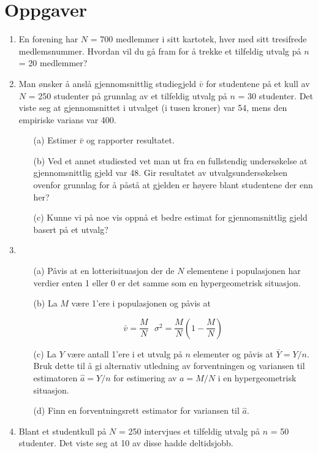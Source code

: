 \section{Oppgaver}
\small
\begin{enumerate}
\item  En forening har $N$ = 700 medlemmer i sitt kartotek, hver med sitt
tresifrede medlemsnummer.  Hvordan vil du gå fram for å trekke et
tilfeldig utvalg på $n$= 20 medlemmer?

\item  Man ønsker å anslå gjennomsnittlig studiegjeld $\bar{v}$
for studentene på et kull av $N$ = 250 studenter på grunnlag av et
tilfeldig utvalg på $n$ = 30 studenter.  Det viste seg at gjennomsnittet
i utvalget (i tusen kroner) var 54, mens den empiriske varians var 400.

\begin{itemize}
\item[(a)]  Estimer $\bar{v}$ og rapporter resultatet.
\item[(b)]  Ved et annet studiested vet man ut fra en fullstendig 
undersøkelse at gjennomsnittlig gjeld var 48.  Gir resultatet av
utvalgsundersøkelsen ovenfor grunnlag for å påstå at gjelden
er høyere blant studentene der enn her?
\item[(c)]  Kunne vi på noe vis oppnå et bedre estimat for 
gjennomsnittlig gjeld basert på et utvalg?
\end{itemize}

\item
\begin{itemize}
\item[(a)] Påvis at en lotterisituasjon der de $N$ elementene i populasjonen
har verdier enten 1 eller 0 er det samme som en hypergeometrisk situasjon.
\item[(b)]  La $M$ være 1'ere i populasjonen og påvis at

\[ \bar{v}=\frac{M}{N}  \mbox{\ \ \ } {\sigma}^2=\frac{M}{N}(1-\frac{M}{N}) \]

\item[(c)]  La $Y$ være antall 1'ere i et utvalg på $n$ elementer og 
påvis at $\bar{Y} = Y/n$.  Bruk dette til å gi alternativ
utledning av forventningen og variansen til estimatoren $\hat{a} = Y/n$
for estimering av $a = M/N$ i en hypergeometrisk situasjon.
\item[(d)]  Finn en forventningsrett estimator for variansen til $\hat{a}$.
\end{itemize}

\item  Blant et studentkull på $N$ = 250 intervjues et tilfeldig utvalg
på $n$ = 50 studenter.  Det viste seg at 10 av disse hadde deltidsjobb.


\end{enumerate}
